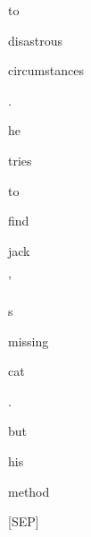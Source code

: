 \documentclass[varwidth=150mm]{standalone}
\begin{document}
\begin{CJK*}{UTF8}{gbsn}
{{{\colorbox{red!0.0}{\strut to} \colorbox{red!1.2082985639572144}{\strut disastrous} \colorbox{red!0.0}{\strut circumstances} \colorbox{red!0.0}{\strut .} \colorbox{red!8.937132835388184}{\strut he} \colorbox{red!5.577004432678223}{\strut tries} \colorbox{red!2.3467142581939697}{\strut to} \colorbox{red!11.179600715637207}{\strut find} \colorbox{red!58.93092727661133}{\strut jack} \colorbox{red!4.2131571769714355}{\strut '} \colorbox{red!0.0}{\strut s} \colorbox{red!13.255728721618652}{\strut missing} \colorbox{red!12.35463809967041}{\strut cat} \colorbox{red!0.0}{\strut .} \colorbox{red!13.829544067382812}{\strut but} \colorbox{red!56.79502487182617}{\strut his} \colorbox{red!60.46397399902344}{\strut method} \colorbox{red!4.681656837463379}{\strut [SEP]}
}}}
\end{CJK*}
\end{document}
